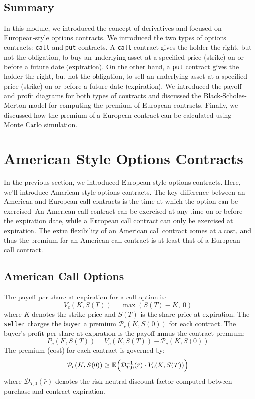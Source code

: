 \documentclass[11pt]{article}
\theoremstyle{definition}
\begin{document}
\subsection{Summary}
In this module, we introduced the concept of derivatives and focused on European-style options contracts. 
We introduced the two types of options contracts: \texttt{call} and \texttt{put} contracts. 
A \texttt{call} contract gives the holder the right, but not the obligation, to buy an underlying asset at a specified price (strike) 
on or before a future date (expiration). On the other hand, a \texttt{put} contract gives the holder the right, but not the obligation, 
to sell an underlying asset at a specified price (strike) on or before a future date (expiration). 
We introduced the payoff and profit diagrams for both types of contracts and discussed 
the Black-Scholes-Merton model for computing the premium of European contracts. 
Finally, we discussed how the premium of a European contract can be calculated using Monte Carlo simulation.

\section{American Style Options Contracts}
In the previous section, we introduced European-style options contracts. Here, we'll introduce American-style options contracts.
The key difference between an American and European call contracts is the time at which the option can be exercised.
An American call contract can be exercised at any time on or before the expiration date, while a European call contract can only be exercised at expiration.
The extra flexibility of an American call contract comes at a cost, and thus the premium for an American call contract is at least that of a European call contract.

\subsection{American Call Options}
The payoff per share at expiration for a call option is:
\begin{equation*}
V_{c}(K,S(T)) = \max\left(S(T) - K,~0\right)
\end{equation*}
where $K$ denotes the strike price and $S(T)$ is the share price at expiration. 
The \texttt{seller} charges the \texttt{buyer} a premium $\mathcal{P}_{c}(K,S(0))$ for each contract.
The buyer's profit per share at expiration is the payoff minus the contract premium:
\begin{equation*}
P_{c}(K,S(T)) = V_{c}(K,S(T)) -  \mathcal{P}_{c}(K,S(0))
\end{equation*}
The premium (cost) for each contract is governed by:
\begin{equation*}
\mathcal{P}_{c}(K,S(0))\geq\mathbb{E}\Bigl(\mathcal{D}^{-1}_{T,0}(\bar{r})\cdot{V_{c}}(K,S(T))\Bigr)
\end{equation*}
where $\mathcal{D}_{T,0}(\bar{r})$ denotes the risk neutral discount factor computed between purchase and contract expiration.
\end{document}
